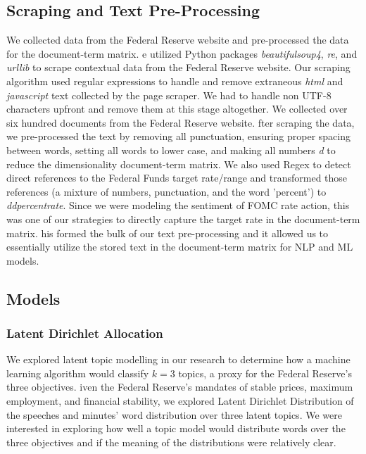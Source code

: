 \documentclass[11pt]{article}
\newcommand{\vertSpace}[1]{\vspace{3mm}}
\begin{document}
\subsection{Scraping and Text Pre-Processing}

We collected data from the Federal Reserve website and pre-processed the data for the document-term matrix. \vertSpace


We utilized Python packages \textit{beautifulsoup4}, \textit{re}, and \textit{urllib} to scrape contextual data from the Federal Reserve website.  Our scraping algorithm used regular expressions to handle and remove extraneous \textit{html} and \textit{javascript} text collected by the page scraper.  We had to handle non UTF-8 characters upfront and remove them at this stage altogether.  We collected over six hundred documents from the Federal Reserve website. \vertSpace


After scraping the data, we pre-processed the text by removing all punctuation, ensuring proper spacing between words, setting all words to lower case, and making all numbers \textit{d} to reduce the dimensionality document-term matrix.  We also used Regex to detect direct references to the Federal Funds target rate/range and transformed those references (a mixture of numbers, punctuation, and the word 'percent') to \textit{ddpercentrate}.  Since we were modeling the sentiment of FOMC rate action, this was one of our strategies to directly capture the target rate in the document-term matrix. \vertSpace


This formed the bulk of our text pre-processing and it allowed us to essentially utilize the stored text in the document-term matrix for NLP and ML models. 



\subsection{Models}

\subsubsection{Latent Dirichlet Allocation}

We explored latent topic modelling in our research to determine how a machine learning algorithm would classify $k=3$ topics, a proxy for the Federal Reserve's three objectives. \vertSpace


Given the Federal Reserve's mandates of stable prices, maximum employment, and financial stability, we explored Latent Dirichlet Distribution of the speeches and minutes' word distribution over three latent topics.  We were interested in exploring how well a topic model would distribute words over the three objectives and if the meaning of the distributions were relatively clear.  
\end{document}
